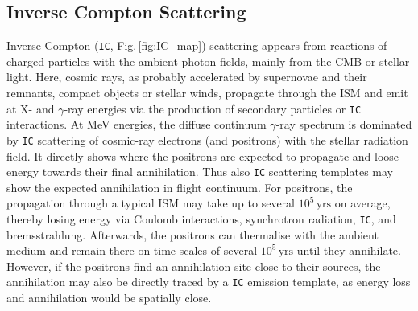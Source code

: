 \documentclass[doublespace,draft,nopageskip]{VTthesis} %
\newcommand{\mrm}[1]{\mathrm{#1}}
\begin{document}
\begin{appendices}
	
	\subsection{Inverse Compton Scattering}
	
	Inverse Compton (\texttt{IC}, Fig.\,\ref{fig:IC_map}) scattering appears from reactions of charged particles with the ambient photon fields, mainly from the CMB or stellar light.
	Here, cosmic rays, as probably accelerated by supernovae and their remnants, compact objects or stellar winds, propagate through the ISM and emit at X- and $\gamma$-ray energies via the production of secondary particles or \texttt{IC} interactions.
	At MeV energies, the diffuse continuum $\gamma$-ray spectrum is dominated by \texttt{IC} scattering of cosmic-ray electrons (and positrons) with the stellar radiation field.
	It directly shows where the positrons are expected to propagate and loose energy towards their final annihilation.
	Thus also \texttt{IC} scattering templates may show the expected annihilation in flight continuum.
	For positrons, the propagation through a typical ISM may take up to several $10^5\,\mrm{yrs}$ on average, thereby losing energy via Coulomb interactions, synchrotron radiation, \texttt{IC}, and bremsstrahlung.
	Afterwards, the positrons can thermalise with the ambient medium and remain there on time scales of several $10^{5}\,\mrm{yrs}$ until they annihilate.
	However, if the positrons find an annihilation site close to their sources, the annihilation may also be directly traced by a \texttt{IC} emission template, as energy loss and annihilation would be spatially close.
	
	

\end{appendices}
\end{document}
